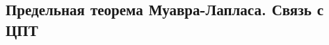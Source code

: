 \subsection{Предельная теорема Муавра-Лапласа. Связь с
ЦПТ}\label{ux43fux440ux435ux434ux435ux43bux44cux43dux430ux44f-ux442ux435ux43eux440ux435ux43cux430-ux43cux443ux430ux432ux440ux430-ux43bux430ux43fux43bux430ux441ux430.-ux441ux432ux44fux437ux44c-ux441-ux446ux43fux442}

